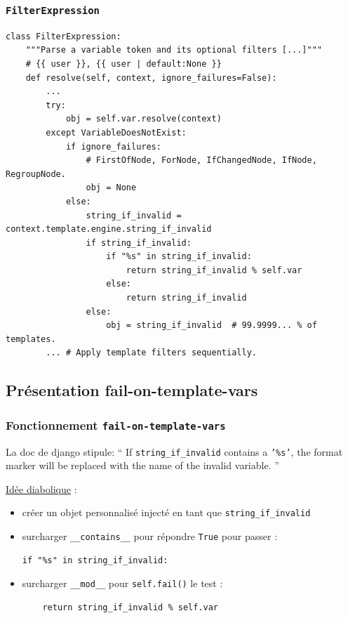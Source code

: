 \documentclass{beamer}
\begin{document}
\begin{frame}[fragile]
    \frametitle{\texttt{FilterExpression}}

    \begin{verbatim}
class FilterExpression:
    """Parse a variable token and its optional filters [...]"""
    # {{ user }}, {{ user | default:None }}
    def resolve(self, context, ignore_failures=False):
        ...
        try:
            obj = self.var.resolve(context)
        except VariableDoesNotExist:
            if ignore_failures:
                # FirstOfNode, ForNode, IfChangedNode, IfNode, RegroupNode.
                obj = None
            else:
                string_if_invalid = context.template.engine.string_if_invalid
                if string_if_invalid:
                    if "%s" in string_if_invalid:
                        return string_if_invalid % self.var
                    else:
                        return string_if_invalid
                else:
                    obj = string_if_invalid  # 99.9999... % of templates.
        ... # Apply template filters sequentially.
    \end{verbatim}
\end{frame}

\subsection*{Présentation fail-on-template-vars}

\begin{frame}[fragile]
    \frametitle{Fonctionnement \texttt{fail-on-template-vars}}

    La doc de django stipule:
    \foreignquote{english}{
        If \texttt{string\_if\_invalid} contains a \texttt{'\%s'}, the format
        marker will be replaced with the name of the invalid variable.
    }

    \vspace{1cm}

    \href{https://github.com/pytest-dev/pytest-django/blob/1ffc3239387bcfadbd8aecfdfacf3d6b52b947f8/pytest_django/plugin.py\#L661}{Idée diabolique} :
    \begin{itemize}
        \item créer un objet personnalisé injecté en tant que \texttt{string\_if\_invalid}
        \item surcharger \texttt{\_\_contains\_\_} pour répondre \texttt{True} pour passer :
\begin{verbatim}
if "%s" in string_if_invalid:
\end{verbatim}

        \item surcharger \texttt{\_\_mod\_\_} pour \texttt{self.fail()} le test :
\begin{verbatim}
    return string_if_invalid % self.var
\end{verbatim}
    \end{itemize}
\end{frame}
\end{document}
